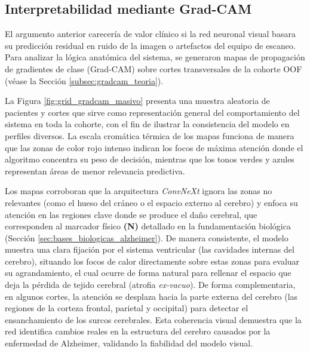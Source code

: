 \documentclass[12pt, oneside, english, spanish]{book}
\begin{document}
\subsection{Interpretabilidad mediante Grad-CAM} \label{subsec:binario_gradcam}

El argumento anterior carecería de valor clínico si la red neuronal visual basara su predicción residual en ruido de la imagen o artefactos del equipo de escaneo. Para analizar la lógica anatómica del sistema, se generaron mapas de propagación de gradientes de clase (Grad-CAM) \cite{selvaraju2017grad} sobre cortes transversales de la cohorte OOF (véase la Sección \ref{subsec:gradcam_teoria}).

La Figura \ref{fig:grid_gradcam_masivo} presenta una muestra aleatoria de pacientes y cortes que sirve como representación general del comportamiento del sistema en toda la cohorte, con el fin de ilustrar la consistencia del modelo en perfiles diversos. La escala cromática térmica de los mapas funciona de manera que las zonas de color rojo intenso indican los focos de máxima atención donde el algoritmo concentra su peso de decisión, mientras que los tonos verdes y azules representan áreas de menor relevancia predictiva.

Los mapas corroboran que la arquitectura \textit{ConvNeXt} ignora las zonas no relevantes (como el hueso del cráneo o el espacio externo al cerebro) y enfoca su atención en las regiones clave donde se produce el daño cerebral, que corresponden al marcador físico \textbf{(N)} detallado en la fundamentación biológica (Sección \ref{sec:bases_biologicas_alzheimer}). De manera consistente, el modelo muestra una clara fijación por el sistema ventricular (las cavidades internas del cerebro), situando los focos de calor directamente sobre estas zonas para evaluar su agrandamiento, el cual ocurre de forma natural para rellenar el espacio que deja la pérdida de tejido cerebral (atrofia \textit{ex-vacuo}). De forma complementaria, en algunos cortes, la atención se desplaza hacia la parte externa del cerebro (las regiones de la corteza frontal, parietal y occipital) para detectar el ensanchamiento de los surcos cerebrales. Esta coherencia visual demuestra que la red identifica cambios reales en la estructura del cerebro causados por la enfermedad de Alzheimer, validando la fiabilidad del modelo visual.
\end{document}
